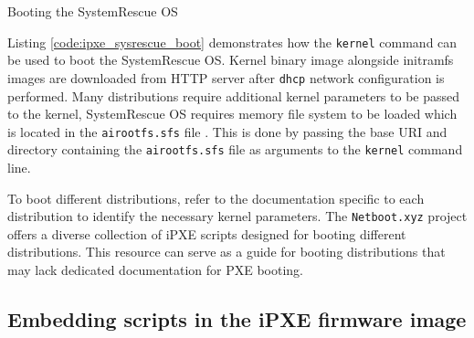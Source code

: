 \documentclass[../main.tex]{subfiles}
\begin{document}
\begin{listing}[H]
  \caption{Booting the SystemRescue\cite{sysrescuecd} OS}
  \label{code:ipxe_sysrescue_boot}
\end{listing}

Listing \ref{code:ipxe_sysrescue_boot} demonstrates how the \texttt{kernel} command can be used to boot the SystemRescue OS.
Kernel binary image alongside initramfs images are downloaded from HTTP server after \texttt{dhcp} network configuration is performed.
Many distributions require additional kernel parameters to be passed to the kernel, SystemRescue OS requires
memory file system to be loaded which is located in the \texttt{airootfs.sfs} file \cite{systemrescue_airootfs_pxe}.
This is done by passing the base URI and directory containing the \texttt{airootfs.sfs} file as arguments to the \texttt{kernel} command line.


To boot different distributions, refer to the documentation specific to each distribution to identify the necessary kernel parameters.
The \texttt{Netboot.xyz} project \cite{netbootxyz} offers a diverse collection of iPXE scripts designed for booting different distributions.
This resource can serve as a guide for booting distributions that may lack dedicated documentation for PXE booting.



\subsection{Embedding scripts in the iPXE firmware image}
\end{document}
